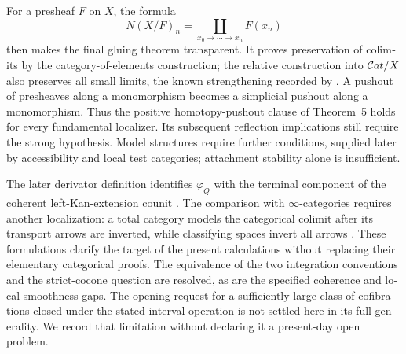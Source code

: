\begin{otherlanguage}{english}
For a presheaf $F$ on $X$, the formula
\[
 N(X/F)_n=\coprod_{x_0\to\cdots\to x_n}F(x_n)
\]
then makes the final gluing theorem transparent. It proves preservation of colimits by the category-of-elements construction; the relative construction into $\mathcal{C}at/X$ also preserves all small limits, the known strengthening recorded by \citet[Proposition~3.2.12 and Corollary~3.2.13]{Cisinski2006}. A pushout of presheaves along a monomorphism becomes a simplicial pushout along a monomorphism. Thus the positive homotopy-pushout clause of Theorem~5 holds for every fundamental localizer. Its subsequent reflection implications still require the strong hypothesis. Model structures require further conditions, supplied later by accessibility and local test categories; attachment stability alone is insufficient.

The later derivator definition identifies $\varphi_Q$ with the terminal component of the coherent left-Kan-extension counit \citep[Definition~3.9]{Groth2013}. The comparison with $\infty$-categories requires another localization: a total category models the categorical colimit after its transport arrows are inverted, while classifying spaces invert all arrows \citep[Corollary~3.3.4.3]{Lurie2009HTT}. These formulations clarify the target of the present calculations without replacing their elementary categorical proofs. The equivalence of the two integration conventions and the strict-cocone question are resolved, as are the specified coherence and local-smoothness gaps. The opening request for a sufficiently large class of cofibrations closed under the stated interval operation is not settled here in its full generality. We record that limitation without declaring it a present-day open problem.
\end{otherlanguage}
\dgrchunkend
